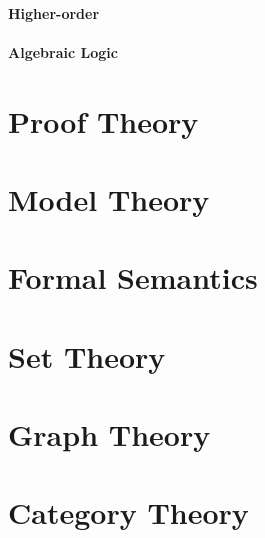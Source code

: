 \documentclass{article}
\begin{document}
\subsection{Higher-order}

\subsection{Algebraic Logic}



\part{Proof Theory}


\part{Model Theory}


\part{Formal Semantics}


\part{Set Theory}


\part{Graph Theory}


\part{Category Theory}

\end{document}
